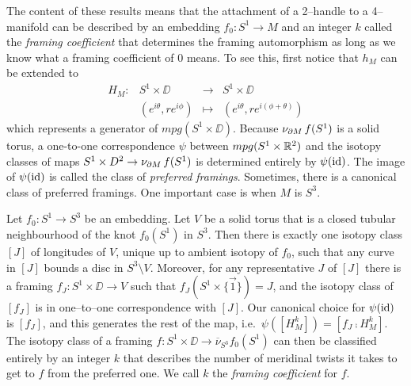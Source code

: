 \begin{rmk}
	\label{rmk:2handle}
	The content of these results means that the attachment of a 2--handle to a 4--manifold can be described by an embedding $f_0:S^1\to M$ and an integer $k$ called the \emph{framing coefficient} that determines the framing automorphism as long as we know what a framing coefficient of $0$ means.
	To see this, first notice that $h_M$ can be extended to
	\[
	\begin{array}{cccc}
		H_M: & S^1\times\DD & \to & S^1\times\DD \\
		& (e^{i\theta}, re^{i\phi}) & \mapsto & (e^{i\theta},re^{i(\phi+\theta)})	
	\end{array}
	\]
	which represents a generator of $mpg(S^1\times\DD)$.
	Because $\nu_{\partial M}\,f(S^1)$ is a solid torus, a one-to-one correspondence
	$\psi$ between $mpg(S^1\times\mathbb{R}^2)$ and the isotopy classes of maps $S^1\times D^2\to\nu_{\partial M}\,f(S^1)$ is determined entirely by $\psi(\mathrm{id})$.
	The image of $\psi(\mathrm{id})$ is called the class of \emph{preferred framings}.
	Sometimes, there is a canonical class of preferred framings.
	One important case is when $M$ is $S^3$.
	
	Let $f_0:S^1\to S^3$ be an embedding.
	Let $V$ be a solid torus that is a closed tubular neighbourhood of the knot $f_0(S^1)$ in $S^3$.
	Then there is exactly one isotopy class $[J]$ of longitudes of $V$, unique up to ambient isotopy of $f_0$, such that any curve in $[J]$ bounds a disc in $S^3\setminus V$.
	Moreover, for any representative $J$ of $[J]$ there is a framing $f_J:S^1\times\DD\to V$ such that $f_J(S^1\times\{\vec{1}\})=J$, and the isotopy class of $[f_J]$ is in one--to--one correspondence with $[J]$.
	Our canonical choice for $\psi(\mathrm{id})$ is $[f_J]$, and this generates the rest of the map, i.e.\ $\psi([H_M^k])=[f_J\comp H_M^k]$.
	The isotopy class of a framing $f:S^1\times\DD\to\overline{\nu}_{S^3}f_0(S^1)$ can then be classified entirely by an integer $k$ that describes the number of meridinal twists it takes to get to $f$ from the preferred one.
	We call $k$ the \emph{framing coefficient} for $f$.
\end{rmk}
